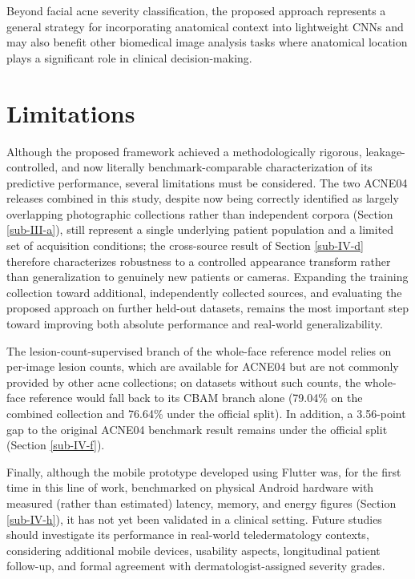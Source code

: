\documentclass[conference]{IEEEtran}
\begin{document}
Beyond facial acne severity classification, the proposed approach represents a general strategy for incorporating anatomical context into lightweight CNNs and may also benefit other biomedical image analysis tasks where anatomical location plays a significant role in clinical decision-making.

\FloatBarrier
\section{Limitations}

Although the proposed framework achieved a methodologically rigorous, leakage-controlled, and now literally benchmark-comparable characterization of its predictive performance, several limitations must be considered. The two ACNE04 releases combined in this study, despite now being correctly identified as largely overlapping photographic collections rather than independent corpora (Section \ref{sub-III-a}), still represent a single underlying patient population and a limited set of acquisition conditions; the cross-source result of Section \ref{sub-IV-d} therefore characterizes robustness to a controlled appearance transform rather than generalization to genuinely new patients or cameras. Expanding the training collection toward additional, independently collected sources, and evaluating the proposed approach on further held-out datasets, remains the most important step toward improving both absolute performance and real-world generalizability.

The lesion-count-supervised branch of the whole-face reference model relies on per-image lesion counts, which are available for ACNE04 but are not commonly provided by other acne collections; on datasets without such counts, the whole-face reference would fall back to its CBAM branch alone (79.04\% on the combined collection and 76.64\% under the official split). In addition, a 3.56-point gap to the original ACNE04 benchmark result remains under the official split (Section \ref{sub-IV-f}).

Finally, although the mobile prototype developed using Flutter was, for the first time in this line of work, benchmarked on physical Android hardware with measured (rather than estimated) latency, memory, and energy figures (Section \ref{sub-IV-h}), it has not yet been validated in a clinical setting. Future studies should investigate its performance in real-world teledermatology contexts, considering additional mobile devices, usability aspects, longitudinal patient follow-up, and formal agreement with dermatologist-assigned severity grades.
\end{document}
